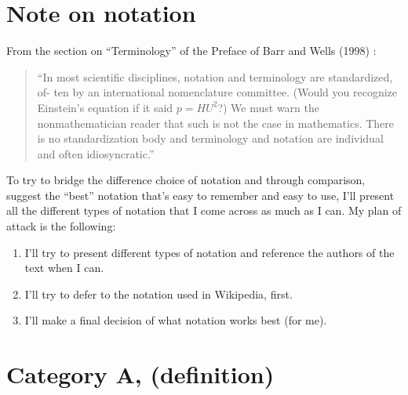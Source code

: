 \documentclass[10pt]{amsart}
\begin{document}
\begin{multicols*}{2}
\section{Note on notation}

From the section on ``Terminology'' of the Preface of Barr and Wells (1998) \cite{BW1998}:

\begin{quote}
	``In most scientific disciplines, notation and terminology are standardized, of- ten by an international nomenclature committee. (Would you recognize Einstein’s equation if it said $p = HU^2$?) We must warn the nonmathematician reader that such is not the case in mathematics. There is no standardization body and terminology and notation are individual and often idiosyncratic.''
\end{quote}

To try to bridge the difference choice of notation and through comparison, suggest the ``best'' notation that's easy to remember and easy to use, I'll present all the different types of notation that I come across as much as I can. My plan of attack is the following:
\begin{enumerate}
	\item I'll try to present different types of notation and reference the authors of the text when I can.
	\item I'll try to defer to the notation used in Wikipedia, first.
	\item I'll make a final decision of what notation works best (for me).
\end{enumerate}

\section{Category $\mathbf{A}$, (definition)}


\end{multicols*}
\end{document}
